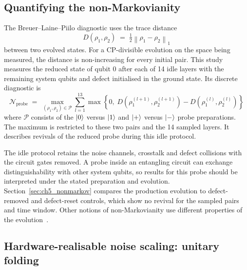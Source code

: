 \documentclass[Thesis.tex]{subfiles}
\begin{document}
\subsection{Quantifying the non-Markovianity}\label{sec:ch3_blp}

The Breuer--Laine--Piilo diagnostic uses the trace distance
\cite{breuer2009measure}
\begin{equation}
    D(\rho_1, \rho_2) \;=\; \tfrac{1}{2} \left\| \rho_1 - \rho_2 \right\|_1
    \label{eq:ch3_tracedist}
\end{equation}
between two evolved states. For a CP-divisible evolution on the space being
measured, the distance is non-increasing for every initial pair. This study
measures the reduced state of qubit $0$ after each of 14 idle layers with the
remaining system qubits and defect initialised in the ground state. Its
discrete diagnostic is
\begin{equation}
    \mathcal{N}_{\mathrm{probe}} \;=\;
    \max_{(\rho_1,\rho_2)\in\mathcal{P}} \sum_{l=1}^{13} \max\!\left\{ 0,\;
    D\!\left(\rho_1^{(l+1)}, \rho_2^{(l+1)}\right)
    - D\!\left(\rho_1^{(l)}, \rho_2^{(l)}\right) \right\}
    \label{eq:ch3_blp}
\end{equation}
where $\mathcal{P}$ consists of the $\ket{0}$ versus $\ket{1}$ and
$\ket{+}$ versus $\ket{-}$ probe preparations. The maximum is restricted
to these two pairs and the 14 sampled layers. It describes revivals of the
reduced probe during this idle protocol.

The idle protocol retains the noise channels, crosstalk and defect collisions
with the circuit gates removed. A probe inside an
entangling circuit can exchange distinguishability with other system qubits,
so results for this probe should be interpreted under the stated preparation
and evolution. Section~\ref{sec:ch5_nonmarkov} compares the production
evolution to defect-removed and defect-reset controls, which show no revival
for the sampled pairs and time window. Other notions of non-Markovianity
use different properties of the evolution~\cite{rivas2014nonmarkov}.

\subsection{Hardware-realisable noise scaling: unitary folding}
\label{sec:ch3_folding}
\end{document}
